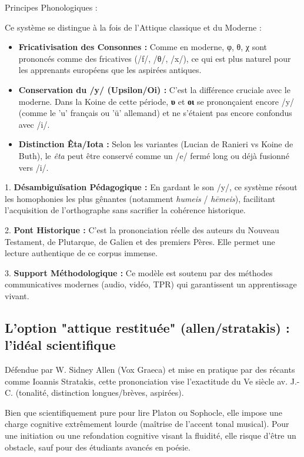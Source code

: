 Principes Phonologiques :

Ce système se distingue à la fois de l'Attique classique et du Moderne :

\begin{itemize}\item \textbf{Fricativisation des Consonnes :} Comme en moderne, φ, θ, χ sont prononcés comme des fricatives (/f/, /θ/, /x/), ce qui est plus naturel pour les apprenants européens que les aspirées antiques.\cite{ref14}\item \textbf{Conservation du /y/ (Upsilon/Oi) :} C'est la différence cruciale avec le moderne. Dans la Koine de cette période, \textbf{υ} et \textbf{οι} se prononçaient encore /y/ (comme le 'u' français ou 'ü' allemand) et ne s'étaient pas encore confondus avec /i/.\cite{ref14}\item \textbf{Distinction Êta/Iota :} Selon les variantes (Lucian de Ranieri vs Koine de Buth), le \textit{êta} peut être conservé comme un /e/ fermé long ou déjà fusionné vers /i/.\cite{ref37}\end{itemize}1. \textbf{Désambiguïsation Pédagogique :} En gardant le son /y/, ce système résout les homophonies
les plus gênantes (notamment \textit{humeis} / \textit{hēmeis}), facilitant l'acquisition de
l'orthographe sans sacrifier la cohérence historique.\cite{ref14}

2. \textbf{Pont Historique :} C'est la prononciation réelle des auteurs du Nouveau Testament, de
Plutarque, de Galien et des premiers Pères. Elle permet une lecture authentique de ce corpus
immense.

3. \textbf{Support Méthodologique :} Ce modèle est soutenu par des méthodes communicatives modernes
(audio, vidéo, TPR) qui garantissent un apprentissage vivant.\cite{ref27}



\subsection{L'option "attique restituée" (allen/stratakis) : l'idéal scientifique}

Défendue par W. Sidney Allen (Vox Graeca) et mise en pratique par des récants comme Ioannis
Stratakis, cette prononciation vise l'exactitude du Ve siècle av. J.-C. (tonalité, distinction
longues/brèves, aspirées).\cite{ref6}

Bien que scientifiquement \og pure\fg{} pour lire Platon ou Sophocle, elle impose une charge
cognitive extrêmement lourde (maîtrise de l'accent tonal musical). Pour une initiation ou une
refondation cognitive visant la fluidité, elle risque d'être un obstacle, sauf pour des étudiants
avancés en poésie.\cite{ref42}



